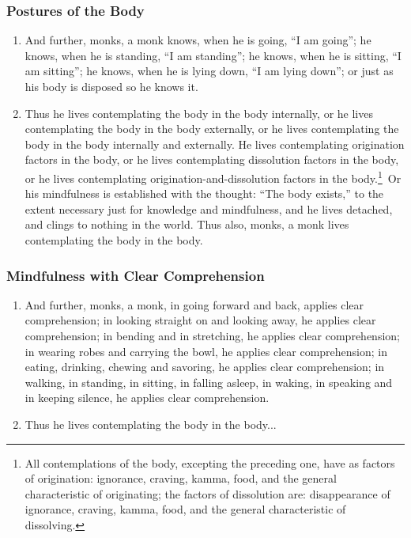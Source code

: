 \documentclass[a4 paper, 12pt]{article}
\begin{document}
\subsubsection*{Postures of the Body}
\begin{enumerate}[resume]
\item And further, monks, a monk knows, when he is going, “I am going”; he knows, when he is standing, “I am standing”; he knows, when he is sitting, “I am sitting”; he knows, when he is lying down, “I am lying down”; or just as his body is disposed so he knows it.
\item Thus he lives contemplating the body in the body internally, or he lives contemplating the body in the body externally, or he lives contemplating the body in the body internally and externally. He lives contemplating origination factors in the body, or he lives contemplating dissolution factors in the body, or he lives contemplating origination-and-dissolution factors in the body.\footnote{All contemplations of the body, excepting the preceding one, have as factors of origination: ignorance, craving, kamma, food, and the general characteristic of originating; the factors of dissolution are: disappearance of ignorance, craving, kamma, food, and the general characteristic of dissolving.} Or his mindfulness is established with the thought: “The body exists,” to the extent necessary just for knowledge and mindfulness, and he lives detached, and clings to nothing in the world. Thus also, monks, a monk lives contemplating the body in the body.
\end{enumerate}

\subsubsection*{Mindfulness with Clear Comprehension}
\begin{enumerate}[resume]
\item And further, monks, a monk, in going forward and back, applies clear comprehension; in looking straight on and looking away, he applies clear comprehension; in bending and in stretching, he applies clear comprehension; in wearing robes and carrying the bowl, he applies clear comprehension; in eating, drinking, chewing and savoring, he applies clear comprehension; in walking, in standing, in sitting, in falling asleep, in waking, in speaking and in keeping silence, he applies clear comprehension.
\item Thus he lives contemplating the body in the body...
\end{enumerate}
\end{document}
